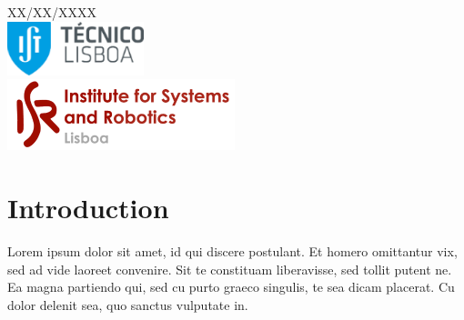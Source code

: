 \begin{titlepage}


{\large XX/XX/XXXX}\\[2cm] %


\includegraphics{ist-logo.png}\\[0.5cm] %

\includegraphics{isr-logo.png}\\[0.5cm] %
 

\vfill %

\end{titlepage}

\section{Introduction}

Lorem ipsum dolor sit amet, id qui discere postulant. Et homero omittantur vix, sed ad vide laoreet convenire. Sit te constituam liberavisse, sed tollit putent ne. Ea magna partiendo qui, sed cu purto graeco singulis, te sea dicam placerat. Cu dolor delenit sea, quo sanctus vulputate in.

